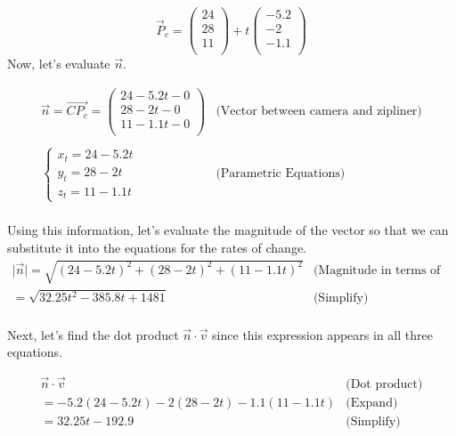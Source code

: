 \documentclass[12pt]{article}
\begin{document}
$$\vec P_c =  \begin{pmatrix} 24 \\ 28 \\ 11 \\ \end{pmatrix} + t \begin{pmatrix} -5.2 \\ -2 \\ -1.1 \\ \end{pmatrix}$$
\newpage
Now, let's evaluate $\vec n$.

$$
\begin{array}{c|c}
    \vec n = \overrightarrow{CP_c} =  \begin{pmatrix} 24 -5.2t - 0 \\ 28 -2t - 0 \\ 11-1.1t -0 \\ \end{pmatrix} & \text{(Vector between camera and zipliner)} \\ \\
    \begin{cases}
      x_t = 24-5.2t \\
      y_t = 28-2t \\
      z_t = 11-1.1t 
    \end{cases} & \text{(Parametric Equations)} \\
 \end{array} 
$$

Using this information, let's evaluate the magnitude of the vector so that we can substitute it into the equations for the rates of change. 
$$
\begin{array}{l|c}
    \mid \vec n \mid = \sqrt{(24-5.2t)^2+(28-2t)^2+(11-1.1t)^2} & \text{(Magnitude in terms of time)} \\
    = \sqrt{32.25t^2 - 385.8t + 1481} & \text{(Simplify)} \\
 \end{array} 
$$

Next, let's find the dot product $\vec n \cdot \vec v$ since this expression appears in all three equations.

$$
\begin{array}{l|c}
    \vec n \cdot \vec v & \text{(Dot product)} \\
    = -5.2(24-5.2t) - 2(28-2t) - 1.1(11-1.1t) & \text{(Expand)}\\
    = 32.25t-192.9& \text{(Simplify)}\\
 \end{array} 
$$
\end{document}
